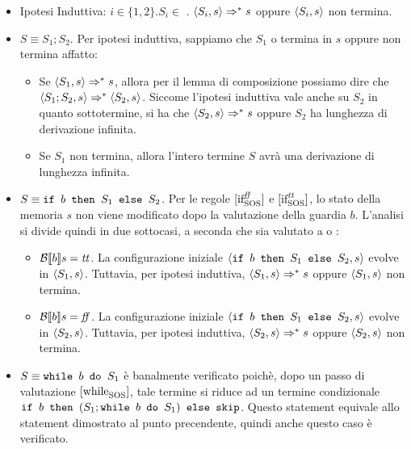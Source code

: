 \begin{itemize}
  \item Ipotesi Induttiva: $i \in \{1,2\}.S_i \in$ \stmm.
$\confSs{S_i}{s} 
\Rar{*} s$ oppure $\confSs{S_i}{s}$ non termina.
  \item $S \equiv{} S_1; S_2$. Per ipotesi induttiva, sappiamo che $S_1$ o
  termina in $s$ oppure non termina affatto:
  \begin{itemize}
    \item Se $\confSs{S_1}{s} \Rar{*} s$, allora per il lemma di composizione
      possiamo dire che $\confSs{S_1;S_2}{s} \Rar{*} \confSs{S_2}{s}$. Siccome
      l'ipotesi induttiva vale anche su $S_2$ in quanto sottotermine, si ha che
      $\confSs{S_2}{s} \Rar{*} s$ oppure $S_2$ ha lunghezza di derivazione
      infinita.
    \item Se $S_1$ non termina, allora l'intero termine $S$ avrà una
      derivazione di lunghezza infinita.
  \end{itemize}

  \item $S \equiv{} \ifABC{b}{S_1}{S_2}$. Per le regole $\ifffSOS{}$ e
    $\ifttSOS{}$, lo stato della memoria $s$ non viene modificato dopo la
    valutazione della guardia $b$. L'analisi si divide quindi in due sottocasi,
    a seconda che  sia valutato a \semtrue{} o \semfalse{}:
    \begin{itemize}
      \item $\B{b} = \semtrue{}$. La configurazione iniziale
        $\confSs{\ifABC{b}{S_1}{S_2}}{s}$ evolve in
        $\confSs{S_1}{s}$. Tuttavia, per ipotesi induttiva,
        $\confSs{S_1}{s} \Rar{*} s$ oppure $\confSs{S_1}{s}$ non termina.
      \item $\B{b} = \semfalse{}$. La configurazione iniziale
        $\confSs{\ifABC{b}{S_1}{S_2}}{s}$ evolve in
        $\confSs{S_2}{s}$. Tuttavia, per ipotesi induttiva,
        $\confSs{S_2}{s} \Rar{*} s$ oppure $\confSs{S_2}{s}$ non termina.
    \end{itemize}

  \item $S \equiv{} \wbS{b}{S_1}$ è banalmente verificato poichè, dopo un passo
    di valutazione $\whileSOS$, tale termine si riduce ad un termine condizionale
    $\ifABC{b}{(S_1;\wbS{b}{S_1})}{\skipForFriends}$. Questo statement equivale
    allo statement dimostrato al punto precendente, quindi anche questo caso è 
    verificato.
\end{itemize}

\let\stmm\undefined
{}
